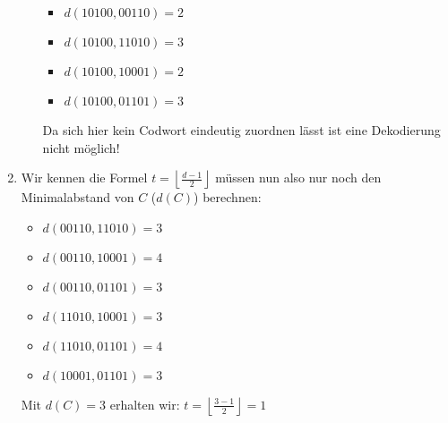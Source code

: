 \begin{aufgabe}[Codes][4]
\begin{enumerate}[label=\alph*)]
\begin{itemize}[label=--]
\begin{multicols}{2}
\begin{itemize}[label=]
                \item \(d(10100, 00110) = 2\)
                \item \(d(10100, 11010) = 3\)
                \item \(d(10100, 10001) = 2\)
                \item \(d(10100, 01101) = 3\)
            \end{itemize}
        \end{multicols}
        Da sich hier kein Codwort eindeutig zuordnen lässt ist eine Dekodierung nicht möglich!
    \end{itemize}
    \item Wir kennen die Formel \(t = \left\lfloor \frac{d-1}{2}\right\rfloor \) müssen nun also nur noch den Minimalabstand von $C$ ($d(C)$) berechnen: 
    \begin{multicols}{3}
        \begin{itemize}[label=]\narrowitems
            \item \(d(00110, 11010) = 3\)
            \item \(d(00110, 10001) = 4\)
            \item \(d(00110, 01101) = 3\)
            \item \(d(11010, 10001) = 3\)
            \item \(d(11010, 01101) = 4\)
            \item \(d(10001, 01101) = 3\)
        \end{itemize}
    \end{multicols}
    Mit $d(C) = 3$ erhalten wir: \(t = \left\lfloor \frac{3-1}{2}\right\rfloor = 1\)
\end{enumerate}
\end{aufgabe}
\newpage
